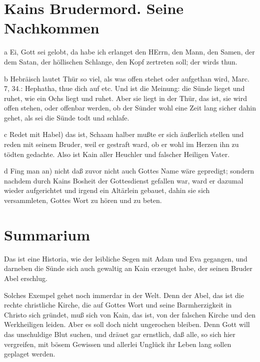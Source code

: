\section{Kains Brudermord. Seine Nachkommen}

a Ei, Gott sei gelobt, da habe ich erlanget den HErrn, den Mann, den Samen, der dem Satan, der höllischen Schlange, den Kopf zertreten soll; der wirds thun.

b Hebräisch lautet Thür so viel, als was offen stehet oder aufgethan wird, Marc. 7, 34.: Hephatha, thue dich auf etc. Und ist die Meinung: die Sünde lieget und ruhet, wie ein Ochs liegt und ruhet. Aber sie liegt in der Thür, das ist, sie wird offen stehen, oder offenbar werden, ob der Sünder wohl eine Zeit lang sicher dahin gehet, als sei die Sünde todt und schlafe.

c Redet mit Habel) das ist, Schaam halber mußte er sich äußerlich stellen und reden mit seinem Bruder, weil er gestraft ward, ob er wohl im Herzen ihn zu tödten gedachte. Also ist Kain aller Heuchler und falscher Heiligen Vater.

d Fing man an) nicht daß zuvor nicht auch Gottes Name wäre gepredigt; sondern nachdem durch Kains Bosheit der Gottesdienst gefallen war, ward er dazumal wieder aufgerichtet und irgend ein Altärlein gebauet, dahin sie sich versammleten, Gottes Wort zu hören und zu beten.

\section{Summarium}

Das ist eine Historia, wie der leibliche Segen mit Adam und Eva gegangen, und darneben die Sünde sich auch gewaltig an Kain erzeuget habe, der seinen Bruder Abel erschlug.

Solches Exempel gehet noch immerdar in der Welt. Denn der Abel, das ist die rechte christliche Kirche, die auf Gottes Wort und seine Barmherzigkeit in Christo sich gründet, muß sich von Kain, das ist, von der falschen Kirche und den Werkheiligen leiden. Aber es soll doch nicht ungerochen bleiben. Denn Gott will das unschuldige Blut suchen, und dräuet gar ernstlich, daß alle, so sich hier vergreifen, mit bösem Gewissen und allerlei Unglück ihr Leben lang sollen geplaget werden.

